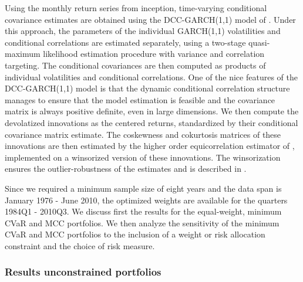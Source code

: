 \documentclass[12pt,a4paper]{article}
\begin{document}
Using the monthly return series from inception, time-varying conditional covariance estimates are obtained using the DCC-GARCH(1,1) model of \citet{EngleDCC02}. Under this approach, the parameters of the individual GARCH(1,1) volatilities and conditional correlations are estimated separately, using a two-stage quasi-maximum likelihood estimation procedure with variance and correlation targeting. The conditional covariances are then computed as products of individual volatilities and conditional correlations. One of the nice features of the DCC-GARCH(1,1) model is that the dynamic  conditional correlation structure manages to ensure that the model
estimation is feasible and the covariance matrix is always positive definite, even in large dimensions.
  We then compute the devolatized innovations as the centered returns, standardized by their conditional covariance matrix estimate.  The coskewness and cokurtosis matrices of these innovations are then estimated by the higher order equicorrelation estimator of \citet{MartelliniZiemann2010}, implemented on a winsorized version of these innovations. The winsorization ensures the outlier-robustness of the estimates and is described in \citet{Boudt2007}.

Since we required a minimum sample size of eight years and the data span is January 1976 - June 2010, the optimized weights are available for the quarters 1984Q1 - 2010Q3.
We discuss first the results for the equal-weight, minimum CVaR and MCC portfolios. We then analyze the sensitivity of the minimum CVaR and MCC portfolios to the inclusion of a weight or risk allocation constraint and the choice of risk measure.


\subsubsection{Results unconstrained portfolios}
\end{document}
